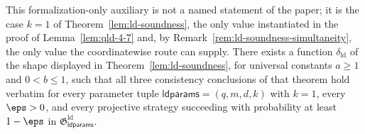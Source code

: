 \begin{theorem}
	\label{lem:ld-soundness-k-one}
	\leanok
	This formalization-only auxiliary is not a named statement of the paper; it is the case $k = 1$ of Theorem~\ref{lem:ld-soundness}, the only value instantiated in the proof of Lemma~\ref{lem:qld-4-7} and, by Remark~\ref{rem:ld-soundness-simultaneity}, the only value the coordinatewise route can supply. There exists a function $\delta_{\mathrm{ld}}$ of the shape displayed in Theorem~\ref{lem:ld-soundness}, for universal constants $a \ge 1$ and $0 < b \le 1$, such that all three consistency conclusions of that theorem hold verbatim for every parameter tuple $\mathsf{ldparams} = (q,m,d,k)$ with $k = 1$, every $\eps > 0$, and every projective strategy succeeding with probability at least $1-\eps$ in $\mathfrak{G}^{\mathrm{ld}}_{\mathsf{ldparams}}$.
\end{theorem}
